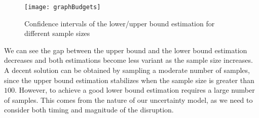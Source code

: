 \documentclass[11pt]{article}
\begin{document}
	\begin{table}[H]
		\caption{Lower bound confidence interval for solutions generated by different budgets}
		\label{table:budgetL}
	\end{table}
	
	\begin{figure}[H]
		\centering
		\texttt{[image: graphBudgets]}
		\caption{Confidence intervals of the lower/upper bound estimation for different sample sizes}
		\label{fig:budget}
	\end{figure}
	We can see the gap between the upper bound and the lower bound estimation decreases and both estimations become less variant as the sample size increases. A decent solution can be obtained by sampling a moderate number of samples, since the upper bound estimation stabilizes when the sample size is greater than \(100\). However, to achieve a good lower bound estimation requires a large number of samples. This comes from the nature of our uncertainty model, as we need to consider both timing and magnitude of the disruption. 
	
\end{document}
